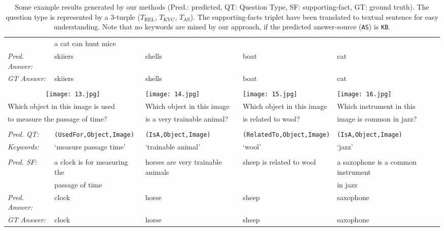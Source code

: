\documentclass[10pt,journal]{IEEEtran}
\def\bluett{}
\begin{document}
\begin{table*}[t!]
{\begin{tabular}{lllll}
		&a cat can hunt mice \\
		\textit{Pred. Answer:} &skiiers&shells&boat&cat\\
		\textit{GT Answer:} &skiiers&shells&boat&cat\\ \hline \\ [-2ex] 
\multicolumn{2}{c}{\hspace{30pt}
   		 \texttt{[image: 13.jpg]}}
		&\texttt{[image: 14.jpg]}
		&\texttt{[image: 15.jpg]}
		&\texttt{[image: 16.jpg]}\\
		\multicolumn{2}{l}{\hspace{35pt}
			Which object in this image is used}
		&Which object in this image 
		&Which object in this image 
		&Which instrument in this   \\
		\multicolumn{2}{l}{\hspace{35pt} 
			to measure the passage of time?}
		&is a very trainable animal?
		&is related to wool?
		&image is common in jazz?\\ \hline \\ [-2ex] 
		\bluett{\textit{Pred. QT:}} & \bluett{\texttt{(UsedFor,Object,Image)} }
		& \bluett{\texttt{(IsA,Object,Image)} }
		& \bluett{\texttt{(RelatedTo,Object,Image)}}
		& \bluett{\texttt{(IsA,Object,Image)}}
		\\ \bluett{\textit{Keywords:}} & \bluett{`measure passage time'}
		& \bluett{`trainable animal'}
		& \bluett{`wool'}
		& \bluett{`jazz'} \\
		\hline \\ [-2ex] 
		\textit{Pred. SF:} 
		&a clock is for measuring the 
		&horses are very trainable animals
		&sheep is related to wool
		&a saxophone is a common instrument\\
&passage  of time
		&
		&
		&in jazz\\
		\textit{Pred. Answer:} &clock&horse&sheep&saxophone\\
		\textit{GT Answer:} &clock&horse&sheep&saxophone\\ \hline
   \end{tabular}}
	\caption{Some example results generated by our methods (Pred.: predicted, 
		QT: Question Type, SF: supporting-fact, GT: ground truth). 
		The question type is represented by a $3$-turple (\texttt{$T_{\mbox{REL}}$}, \texttt{$T_{\mbox{KVC}}$}, \texttt{$T_{\mbox{AS}}$}).
		The supporting-facts triplet have been translated to textual sentence for easy understanding.
	    Note that no keywords are mined by our approach, if the predicted answer-source (\texttt{AS}) is \texttt{KB}.}
	\label{results_examples}
	\vspace{1cm}
\end{table*}
\end{document}

